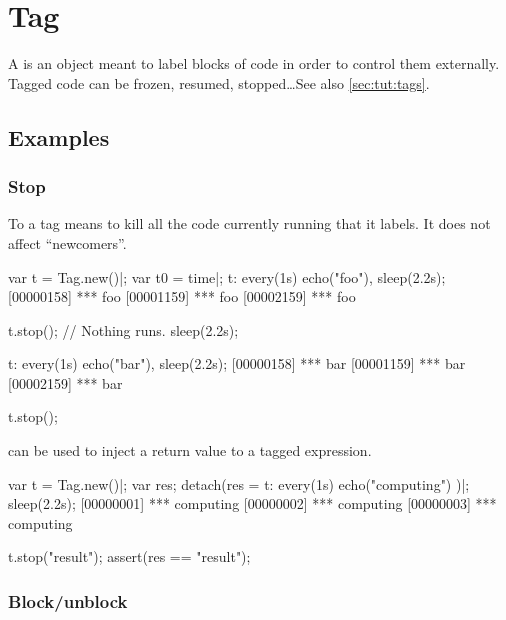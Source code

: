 
\section{Tag}

A  is an object meant to label blocks of code in order to control
them externally.  Tagged code can be frozen, resumed, stopped\ldots See also
\autoref{sec:tut:tags}.

\subsection{Examples}

\subsubsection{Stop}
\label{sec:specs:tag:stop}

To  a tag means to kill all the code currently running that it
labels.  It does not affect ``newcomers''.

\begin{urbiscript}[firstnumber=1]
var t = Tag.new()|;
var t0 = time|;
t: every(1s) echo("foo"),
sleep(2.2s);
[00000158] *** foo
[00001159] *** foo
[00002159] *** foo

t.stop();
// Nothing runs.
sleep(2.2s);

t: every(1s) echo("bar"),
sleep(2.2s);
[00000158] *** bar
[00001159] *** bar
[00002159] *** bar

t.stop();
\end{urbiscript}

 can be used to inject a return value to a tagged
expression.

\begin{urbiscript}[firstnumber=1]
var t = Tag.new()|;
var res;
detach(res = { t: every(1s) echo("computing") })|;
sleep(2.2s);
[00000001] *** computing
[00000002] *** computing
[00000003] *** computing

t.stop("result");
assert(res == "result");
\end{urbiscript}


\subsubsection{Block/unblock}
\label{sec:specs:tag:block}

